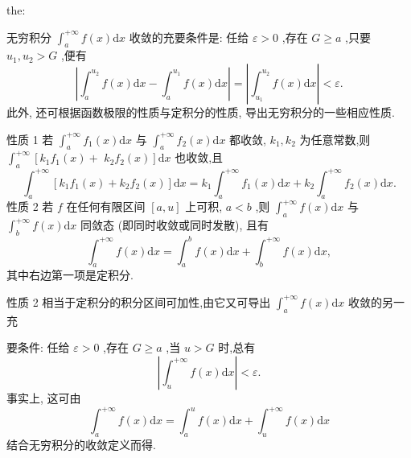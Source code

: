 \begin{theorem}{}{the:}

\end{theorem}
 无穷积分 \({\int }_{a}^{+\infty }f\left( x\right) \mathrm{d}x\) 收敛的充要条件是: 任给 \(\varepsilon  > 0\) ,存在 \(G \geq  a\) ,只要 \({u}_{1},{u}_{2} > G\) ,便有
\[
\left| {{\int }_{a}^{{u}_{2}}f\left( x\right) \mathrm{d}x - {\int }_{a}^{{u}_{1}}f\left( x\right) \mathrm{d}x}\right|  = \left| {{\int }_{{u}_{1}}^{{u}_{2}}f\left( x\right) \mathrm{d}x}\right|  < \varepsilon .
\]
此外, 还可根据函数极限的性质与定积分的性质, 导出无穷积分的一些相应性质.

性质 1 若 \({\int }_{a}^{+\infty }{f}_{1}\left( x\right) \mathrm{d}x\) 与 \({\int }_{a}^{+\infty }{f}_{2}\left( x\right) \mathrm{d}x\) 都收敛, \({k}_{1},{k}_{2}\) 为任意常数,则 \({\int }_{a}^{+\infty }\left\lbrack  {{k}_{1}{f}_{1}\left( x\right)  + }\right.\)  \(\left. {{k}_{2}{f}_{2}\left( x\right) }\right\rbrack  \mathrm{d}x\) 也收敛,且
\[
{\int }_{a}^{+\infty }\left\lbrack  {{k}_{1}{f}_{1}\left( x\right)  + {k}_{2}{f}_{2}\left( x\right) }\right\rbrack  \mathrm{d}x = {k}_{1}{\int }_{a}^{+\infty }{f}_{1}\left( x\right) \mathrm{d}x + {k}_{2}{\int }_{a}^{+\infty }{f}_{2}\left( x\right) \mathrm{d}x. \tag{1}
\]
性质 2 若 \(f\) 在任何有限区间 \(\left\lbrack  {a,u}\right\rbrack\) 上可积, \(a < b\) ,则 \({\int }_{a}^{+\infty }f\left( x\right) \mathrm{d}x\) 与 \({\int }_{b}^{+\infty }f\left( x\right) \mathrm{d}x\) 同敛态 (即同时收敛或同时发散), 且有
\[
{\int }_{a}^{+\infty }f\left( x\right) \mathrm{d}x = {\int }_{a}^{b}f\left( x\right) \mathrm{d}x + {\int }_{b}^{+\infty }f\left( x\right) \mathrm{d}x, \tag{2}
\]
其中右边第一项是定积分.

性质 2 相当于定积分的积分区间可加性,由它又可导出 \({\int }_{a}^{+\infty }f\left( x\right) \mathrm{d}x\) 收敛的另一充

要条件: 任给 \(\varepsilon  > 0\) ,存在 \(G \geq  a\) ,当 \(u > G\) 时,总有
\[
\left| {{\int }_{u}^{+\infty }f\left( x\right) \mathrm{d}x}\right|  < \varepsilon .
\]
事实上, 这可由
\[
{\int }_{a}^{+\infty }f\left( x\right) \mathrm{d}x = {\int }_{a}^{u}f\left( x\right) \mathrm{d}x + {\int }_{u}^{+\infty }f\left( x\right) \mathrm{d}x
\]
结合无穷积分的收敛定义而得.

